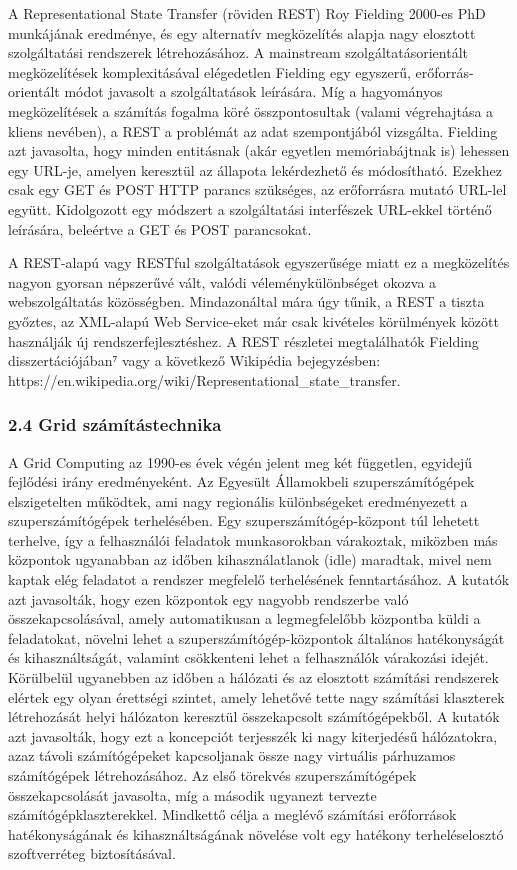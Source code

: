 \documentclass[
]{article}
\begin{document}
A Representational State Transfer (röviden REST) Roy Fielding 2000-es
PhD munkájának eredménye, és egy alternatív megközelítés alapja nagy
elosztott szolgáltatási rendszerek létrehozásához. A mainstream
szolgáltatásorientált megközelítések komplexitásával elégedetlen
Fielding egy egyszerű, erőforrás-orientált módot javasolt a
szolgáltatások leírására. Míg a hagyományos megközelítések a számítás
fogalma köré összpontosultak (valami végrehajtása a kliens nevében), a
REST a problémát az adat szempontjából vizsgálta. Fielding azt
javasolta, hogy minden entitásnak (akár egyetlen memóriabájtnak is)
lehessen egy URL-je, amelyen keresztül az állapota lekérdezhető és
módosítható. Ezekhez csak egy GET és POST HTTP parancs szükséges, az
erőforrásra mutató URL-lel együtt. Kidolgozott egy módszert a
szolgáltatási interfészek URL-ekkel történő leírására, beleértve a GET
és POST parancsokat.

A REST-alapú vagy RESTful szolgáltatások egyszerűsége miatt ez a
megközelítés nagyon gyorsan népszerűvé vált, valódi véleménykülönbséget
okozva a webszolgáltatás közösségben. Mindazonáltal mára úgy tűnik, a
REST a tiszta győztes, az XML-alapú Web Service-eket már csak kivételes
körülmények között használják új rendszerfejlesztéshez. A REST részletei
megtalálhatók Fielding disszertációjában⁷ vagy a következő Wikipédia
bejegyzésben:
https://en.wikipedia.org/wiki/Representational\_state\_transfer.

\hypertarget{grid-szuxe1muxedtuxe1stechnika}{%
\subsubsection{2.4 Grid
számítástechnika}\label{grid-szuxe1muxedtuxe1stechnika}}

A Grid Computing az 1990-es évek végén jelent meg két független,
egyidejű fejlődési irány eredményeként. Az Egyesült Államokbeli
szuperszámítógépek elszigetelten működtek, ami nagy regionális
különbségeket eredményezett a szuperszámítógépek terhelésében. Egy
szuperszámítógép-központ túl lehetett terhelve, így a felhasználói
feladatok munkasorokban várakoztak, miközben más központok ugyanabban az
időben kihasználatlanok (idle) maradtak, mivel nem kaptak elég feladatot
a rendszer megfelelő terhelésének fenntartásához. A kutatók azt
javasolták, hogy ezen központok egy nagyobb rendszerbe való
összekapcsolásával, amely automatikusan a legmegfelelőbb központba küldi
a feladatokat, növelni lehet a szuperszámítógép-központok általános
hatékonyságát és kihasználtságát, valamint csökkenteni lehet a
felhasználók várakozási idejét. Körülbelül ugyanebben az időben a
hálózati és az elosztott számítási rendszerek elértek egy olyan
érettségi szintet, amely lehetővé tette nagy számítási klaszterek
létrehozását helyi hálózaton keresztül összekapcsolt számítógépekből. A
kutatók azt javasolták, hogy ezt a koncepciót terjesszék ki nagy
kiterjedésű hálózatokra, azaz távoli számítógépeket kapcsoljanak össze
nagy virtuális párhuzamos számítógépek létrehozásához. Az első törekvés
szuperszámítógépek összekapcsolását javasolta, míg a második ugyanezt
tervezte számítógépklaszterekkel. Mindkettő célja a meglévő számítási
erőforrások hatékonyságának és kihasználtságának növelése volt egy
hatékony terheléselosztó szoftverréteg biztosításával.
\end{document}
